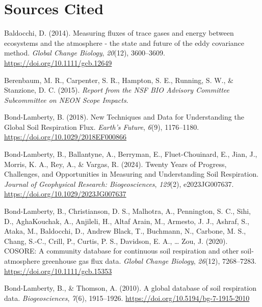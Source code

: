 \documentclass[
  letterpaper,
  DIV=11,
  numbers=noendperiod]{scrartcl}
\newlength{\cslhangindent}
\newenvironment{CSLReferences}[2] %
 {\begin{list}{}{%
  \setlength{\itemindent}{0pt}
  \setlength{\leftmargin}{0pt}
  \setlength{\parsep}{0pt}
  \ifodd #1
   \setlength{\leftmargin}{\cslhangindent}
   \setlength{\itemindent}{-1\cslhangindent}
  \fi
  \setlength{\itemsep}{#2\baselineskip}}}
 {\end{list}}
\begin{document}
\section*{Sources Cited}\label{sources-cited}

\label{refs}
\begin{CSLReferences}{1}{0}
Baldocchi, D. (2014). Measuring fluxes of trace gases and energy between
ecosystems and the atmosphere - the state and future of the eddy
covariance method. \emph{Global Change Biology}, \emph{20}(12),
3600--3609. \url{https://doi.org/10.1111/gcb.12649}

Berenbaum, M. R., Carpenter, S. R., Hampton, S. E., Running, S. W., \&
Stanzione, D. C. (2015). \emph{Report from the {NSF BIO Advisory
Committee Subcommittee} on {NEON Scope Impacts}}.

Bond-Lamberty, B. (2018). New {Techniques} and {Data} for
{Understanding} the {Global Soil Respiration Flux}. \emph{Earth's
Future}, \emph{6}(9), 1176--1180.
\url{https://doi.org/10.1029/2018EF000866}

Bond-Lamberty, B., Ballantyne, A., Berryman, E., Fluet-Chouinard, E.,
Jian, J., Morris, K. A., Rey, A., \& Vargas, R. (2024). Twenty {Years}
of {Progress}, {Challenges}, and {Opportunities} in {Measuring} and
{Understanding Soil Respiration}. \emph{Journal of Geophysical Research:
Biogeosciences}, \emph{129}(2), e2023JG007637.
\url{https://doi.org/10.1029/2023JG007637}

Bond-Lamberty, B., Christianson, D. S., Malhotra, A., Pennington, S. C.,
Sihi, D., AghaKouchak, A., Anjileli, H., Altaf Arain, M., Armesto, J.
J., Ashraf, S., Ataka, M., Baldocchi, D., Andrew Black, T., Buchmann,
N., Carbone, M. S., Chang, S.-C., Crill, P., Curtis, P. S., Davidson, E.
A., \ldots{} Zou, J. (2020). {COSORE}: {A} community database for
continuous soil respiration and other soil-atmosphere greenhouse gas
flux data. \emph{Global Change Biology}, \emph{26}(12), 7268--7283.
\url{https://doi.org/10.1111/gcb.15353}

Bond-Lamberty, B., \& Thomson, A. (2010). A global database of soil
respiration data. \emph{Biogeosciences}, \emph{7}(6), 1915--1926.
\url{https://doi.org/10.5194/bg-7-1915-2010}


\end{CSLReferences}
\end{document}
